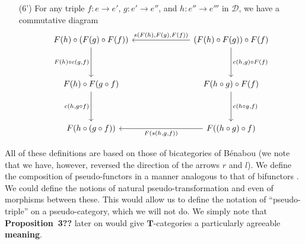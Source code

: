 \documentclass{article}
\newcommand{\oldpage}[1]{\marginpar{\footnotesize$\Big\vert$ \textit{p.~#1}}}
\newcommand{\unsure}[1]{{\color{purple}\textbf{#1}}}
\newcommand{\TT}{\mathbf{T}}
\newcommand{\cat}[1]{\mathcal{#1}}
\begin{document}
\begin{enumerate}
  \item[(6')]
    \oldpage{247}
    For any triple $f\colon e\to e'$, $g\colon e'\to e''$, and $h\colon e''\to e'''$ in $\cat{D}$, we have a commutative diagram
    \[
      \begin{tikzcd}[row sep=huge,column sep=7em]
        F(h)\circ(F(g)\circ F(f))
          \ar[d,swap,"{F(h)\circ c(g,f)}"]
      & (F(h)\circ F(g))\circ F(f)
          \ar[l,swap,"{s(F(h),F(g),F(f))}"]
          \ar[d,"{c(h,g)\circ F(f)}"]
      \\F(h)\circ F(g\circ f)
          \ar[d,swap,"{c(h,g\circ f)}"]
      & F(h\circ g)\circ F(f)
          \ar[d,"{c(h\circ g,f)}"]
      \\F(h\circ(g\circ f))
      & F((h\circ g)\circ f)
          \ar[l,"{F(s(h,g,f))}"]
      \end{tikzcd}
    \]
\end{enumerate}

All of these definitions are based on those of bicategories of Bénabou \cite{Be} (we note that we have, however, reversed the direction of the arrows $r$ and $l$).
We define the composition of pseudo-functors in a manner analogous to that of bifunctors \cite{Be}.
We could define the notions of natural pseudo-transformation and even of morphisms between these.
This would allow us to define the notation of ``pseudo-triple'' on a pseudo-category, which we will not do.
We simply note that \unsure{Proposition~3??} later on would give $\TT$-categories a particularly agreeable \unsure{meaning}.
\end{document}
